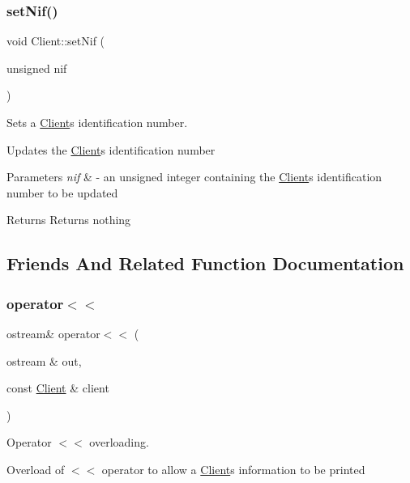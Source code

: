 \subsubsection{\texorpdfstring{set\+Nif()}{setNif()}}
{\footnotesize\ttfamily void Client\+::set\+Nif (\begin{DoxyParamCaption}\item[{unsigned}]{nif }\end{DoxyParamCaption})}



Sets a \hyperlink{class_client}{Client}\textquotesingle{}s identification number. 

Updates the \hyperlink{class_client}{Client}\textquotesingle{}s identification number


\begin{DoxyParams}{Parameters}
{\em nif} & -\/ an unsigned integer containing the \hyperlink{class_client}{Client}\textquotesingle{}s identification number to be updated \\
\hline
\end{DoxyParams}
\begin{DoxyReturn}{Returns}
Returns nothing 
\end{DoxyReturn}


\subsection{Friends And Related Function Documentation}
\mbox{\label{class_client_a001b1071dc56da194d697f845bbc4b1b}} 
\subsubsection{\texorpdfstring{operator$<$$<$}{operator<<}}
{\footnotesize\ttfamily ostream\& operator$<$$<$ (\begin{DoxyParamCaption}\item[{ostream \&}]{out,  }\item[{const \hyperlink{class_client}{Client} \&}]{client }\end{DoxyParamCaption})\hspace{0.3cm}{\ttfamily [friend]}}



Operator $<$$<$ overloading. 

Overload of $<$$<$ operator to allow a \hyperlink{class_client}{Client}\textquotesingle{}s information to be printed


